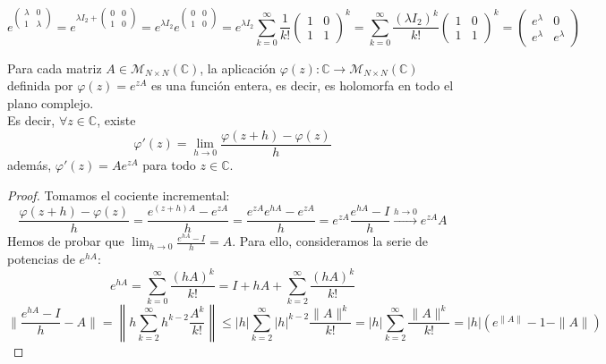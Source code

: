 \[
    e^{\begin{pmatrix}
        \lambda & 0 \\
        1 & \lambda
    \end{pmatrix}} = e^{\lambda I_2 + \begin{pmatrix}
        0 & 0 \\
        1 & 0
    \end{pmatrix}} = e^{\lambda I_2} e^{\begin{pmatrix}
        0 & 0 \\
        1 & 0
    \end{pmatrix}} = e^{\lambda I_2} \sum_{k=0}^\infty \frac{1}{k!} \begin{pmatrix}
        1 & 0 \\
        1 & 1
    \end{pmatrix}^k = \sum_{k=0}^\infty \frac{(\lambda I_2)^k}{k!} \begin{pmatrix}
        1 & 0 \\
        1 & 1
    \end{pmatrix}^k = \begin{pmatrix}
        e^{\lambda} & 0 \\
        e^{\lambda} & e^{\lambda}
    \end{pmatrix}
\]

\begin{teorema}
    Para cada matriz $A \in \mathcal{M}_{N \times N}(\mathbb{C})$, la aplicación $\varphi(z) : \mathbb{C} \to \mathcal{M}_{N \times N}(\mathbb{C})$ definida por $\varphi(z) = e^{zA}$ es una función entera, es decir, es holomorfa en todo el plano complejo.\\
    Es decir, $\forall z \in \mathbb{C}$, existe
    \[
        \varphi'(z) = \lim_{h \to 0} \frac{\varphi(z+h) - \varphi(z)}{h}
    \]
    además, $\varphi'(z) = A e^{zA}$ para todo $z \in \mathbb{C}$.
\end{teorema}

\begin{proof}
    Tomamos el cociente incremental:
    \[
        \frac{\varphi(z+h) - \varphi(z)}{h} = \frac{e^{(z+h)A} - e^{zA}}{h} = \frac{e^{zA} e^{hA} - e^{zA}}{h} = e^{zA} \frac{e^{hA} - I}{h} \xrightarrow{h \to 0} e^{zA} A
    \]
    Hemos de probar que $\lim_{h \to 0} \frac{e^{hA} - I}{h} = A$. Para ello, consideramos la serie de potencias de $e^{hA}$:
    \[
        e^{hA} = \sum_{k=0}^\infty \frac{(hA)^k}{k!} = I + hA + \sum_{k=2}^\infty \frac{(hA)^k}{k!}
    \]
    \[
        \| \frac{e^{hA} - I}{h} - A \| = \left\| h \sum_{k=2}^{\infty} h^{k-2} \frac{A^k}{k!} \right\| \le |h| \sum_{k=2}^{\infty} |h|^{k-2} \frac{\|A\|^k}{k!} = |h| \sum_{k=2} ^{\infty} \frac{\|A\|^k}{k!} = |h| (e^{\|A\|} - 1 - \|A\|)
    \]

\end{proof}


